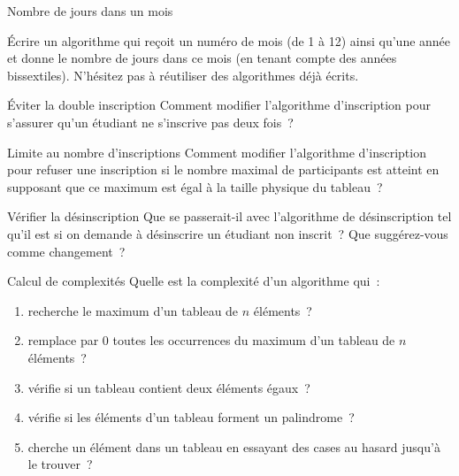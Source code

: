 	\begin{Exercice}{Nombre de jours dans un mois}

		Écrire un algorithme qui reçoit un numéro de mois (de 1 à 12)
		ainsi qu’une année et donne le nombre de jours dans ce mois
		(en tenant compte des années bissextiles).
		N’hésitez pas à réutiliser des algorithmes déjà écrits.
	\end{Exercice}




	\begin{Exercice}{Éviter la double inscription}
		Comment modifier l’algorithme d’inscription
		pour s’assurer qu’un étudiant ne s’inscrive pas deux fois~?
	\end{Exercice}

	\begin{Exercice}{Limite au nombre d’inscriptions}
		Comment modifier l’algorithme d’inscription
		pour refuser une inscription si le nombre maximal
		de participants est atteint
		en supposant que ce maximum est égal à la taille physique du tableau~?
	\end{Exercice}

	\begin{Exercice}{Vérifier la désinscription}
		Que se passerait-il avec l’algorithme
		de désinscription tel qu’il est
		si on demande à désinscrire un étudiant non inscrit~?
		Que suggérez-vous comme changement~?
	\end{Exercice}


	\begin{Exercice}{Calcul de complexités}
		Quelle est la complexité d’un algorithme qui~:		
		\begin{enumerate}[label=\alph*)]
			\item 
				recherche le maximum d’un tableau de $n$ éléments~?
			\item 
				remplace par 0 toutes les occurrences du maximum 
				d’un tableau de $n$ éléments~?
			\item 
				vérifie si un tableau contient deux éléments égaux~?
			\item 
				vérifie si les éléments d’un tableau forment un palindrome~?
			\item
				cherche un élément dans un tableau 
				en essayant des cases au hasard jusqu’à le trouver~?
		\end{enumerate}
	\end{Exercice}

